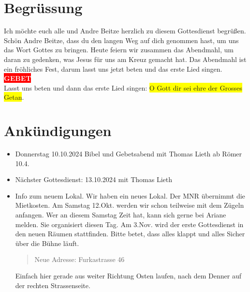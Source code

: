 
\section{Begrüssung}

Ich möchte euch alle und Andre Beitze herzlich zu diesem Gottesdienst begrüßen.
Schön Andre Beitze, dass du den langen Weg auf dich genommen hast, um uns das Wort Gottes zu bringen.
Heute feiern wir zusammen das Abendmahl, um daran zu gedenken, was Jesus für uns am Kreuz gemacht hat. Das Abendmahl ist ein fröhliches Fest, darum lasst uns jetzt beten und das erste Lied singen.\\
\colorbox{red}{\textcolor{white}{\textbf{GEBET}}}\\
Lasst uns beten und dann das erste Lied singen: \colorbox{yellow}{O Gott dir sei ehre der Grosses Getan}.

\section{Ankündigungen}
\begin{itemize}
    \item Donnerstag 10.10.2024 Bibel und Gebetsabend mit Thomas Lieth ab Römer 10.4.
    \item Nächster Gottesdienst: 13.10.2024 mit Thomas Lieth
    \item Info zum neuem Lokal. Wir haben ein neues Lokal. Der MNR übernimmt die Mietkosten. Am Samstag 12.Okt. werden wir schon teilweise mit dem Zügeln anfangen. Wer an diesem Samstag Zeit hat, kann sich gerne bei Ariane melden. Sie organisiert diesen Tag. Am 3.Nov. wird der erste Gottesdienst in den neuen Räumen stattfinden. Bitte betet, dass alles klappt und alles Sicher über die Bühne läuft.
    \begin{quote}
        Neue Adresse:
        Furkastrasse 46        
    \end{quote}
    Einfach hier gerade aus weiter Richtung Osten laufen, nach dem Denner auf der rechten Strassenseite.
\end{itemize}

